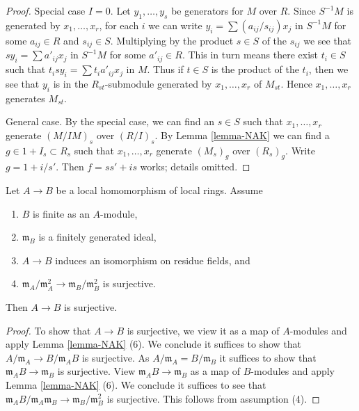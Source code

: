 \begin{proof}
Special case $I = 0$. Let $y_1, \ldots, y_s$ be generators for $M$ over $R$.
Since $S^{-1}M$ is generated by $x_1, \ldots, x_r$, for each $i$
we can write $y_i = \sum (a_{ij}/s_{ij})x_j$ in $S^{-1}M$
for some $a_{ij} \in R$ and $s_{ij} \in S$. Multiplying by the product
$s \in S$ of the $s_{ij}$ we see that $sy_i = \sum a'_{ij}x_j$
in $S^{-1}M$ for some $a'_{ij} \in R$.
This in turn means there exist $t_i \in S$ such that
$t_isy_i = \sum t_ia'_{ij}x_j$ in $M$. Thus if $t \in S$
is the product of the $t_i$, then we
see that $y_i$ is in the $R_{st}$-submodule generated by $x_1, \ldots, x_r$
of $M_{st}$. Hence $x_1, \ldots, x_r$ generates $M_{st}$.

\medskip\noindent
General case. By the special case, we can find an $s \in S$
such that $x_1, \ldots, x_r$ generate $(M/IM)_s$ over $(R/I)_s$.
By Lemma \ref{lemma-NAK} we can find a $g \in 1 + I_s \subset R_s$
such that $x_1, \ldots, x_r$ generate $(M_s)_g$ over $(R_s)_g$.
Write $g = 1 + i/s'$. Then $f = ss' + is$ works; details omitted.
\end{proof}

\begin{lemma}
\label{lemma-when-surjective-local}
Let $A \to B$ be a local homomorphism of local rings.
Assume
\begin{enumerate}
\item $B$ is finite as an $A$-module,
\item $\mathfrak m_B$ is a finitely generated ideal,
\item $A \to B$ induces an isomorphism on residue fields, and
\item $\mathfrak m_A/\mathfrak m_A^2 \to \mathfrak m_B/\mathfrak m_B^2$
is surjective.
\end{enumerate}
Then $A \to B$ is surjective.
\end{lemma}

\begin{proof}
To show that $A \to B$ is surjective, we view it as a map of $A$-modules
and apply Lemma \ref{lemma-NAK} (6). We conclude it suffices
to show that $A/\mathfrak m_A \to B/\mathfrak m_AB$ is surjective.
As $A/\mathfrak m_A = B/\mathfrak m_B$ it suffices to show that
$\mathfrak m_AB \to \mathfrak m_B$ is surjective. View
$\mathfrak m_AB \to \mathfrak m_B$ as a map of $B$-modules and apply
Lemma \ref{lemma-NAK} (6). We conclude it suffices to see that
$\mathfrak m_AB/\mathfrak m_A\mathfrak m_B \to \mathfrak m_B/\mathfrak m_B^2$
is surjective. This follows from assumption (4).
\end{proof}








